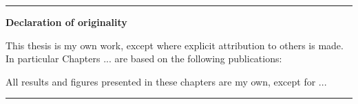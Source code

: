 \begin{titlepage}
\begin{vcenterpage}
\noindent\rule[2pt]{\textwidth}{0.5pt}
\begin{center}
{\large\textbf{Declaration of originality}}
\end{center}
This thesis is my own work, except where explicit attribution to others is made. In particular Chapters ... are based on the following publications:

All results and figures presented in these chapters are my own, except for ...

\noindent\rule[2pt]{\textwidth}{0.5pt}
\end{vcenterpage}

\cleardoublepage

\thispagestyle{empty}









    





\end{titlepage}
\sloppy

\titlepage
